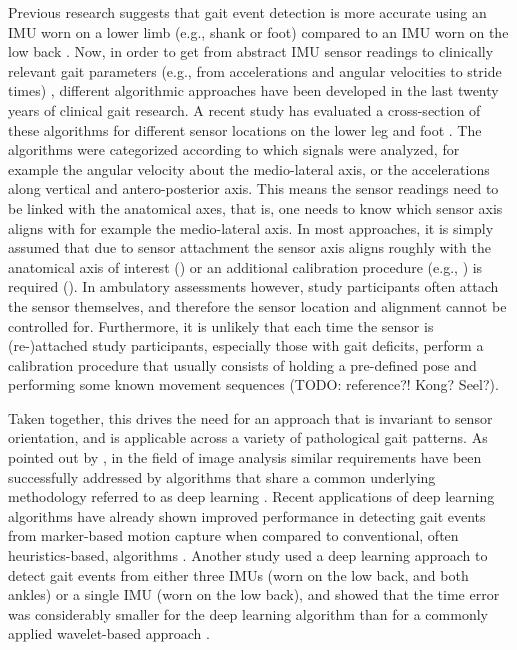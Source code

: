 \documentclass[sensors,article,submit,pdftex,moreauthors]{Definitions/mdpi}
\begin{document}
Previous research suggests that gait event detection is more accurate using an IMU worn on a lower limb (e.g., shank or foot) compared to an IMU worn on the low back \cite{BenMansour2015,Storm2016,Panebianco2018}. Now, in order to get from abstract IMU sensor readings to clinically relevant gait parameters (e.g., from accelerations and angular velocities to stride times) \cite{Hannink2016}, different algorithmic approaches have been developed in the last twenty years of clinical gait research. A recent study has evaluated a cross-section of these algorithms for different sensor locations on the lower leg and foot \cite{Niswander2021}. The algorithms were categorized according to which signals were analyzed, for example the angular velocity about the medio-lateral axis, or the accelerations along vertical and antero-posterior axis. This means the sensor readings need to be linked with the anatomical axes, that is, one needs to know which sensor axis aligns with for example the medio-lateral axis. In most approaches, it is simply assumed that due to sensor attachment the sensor axis aligns roughly with the anatomical axis of interest (\cite{Salarian2004,Sabatini2005,Jasiewicz2006,Catalfamo2010,Trojaniello2014,Maqbool2016,Romijnders2021}) or an additional calibration procedure (e.g., \cite{Ferraris1995}) is required (\cite{Greene2010,Niswander2021}). In ambulatory assessments however, study participants often attach the sensor themselves, and therefore the sensor location and alignment cannot be controlled for. Furthermore, it is unlikely that each time the sensor is (re-)attached study participants, especially those with gait deficits, perform a calibration procedure that usually consists of holding a pre-defined pose and performing some known movement sequences (TODO: reference?! Kong? Seel?). 

Taken together, this drives the need for an approach that is invariant to sensor orientation, and is applicable across a variety of pathological gait patterns. As pointed out by \cite{Hannink2016}, in the field of image analysis similar requirements have been successfully addressed by algorithms that share a common underlying methodology referred to as deep learning \cite{LeCun2015,TerHaarRomeny2019}. Recent applications of deep learning algorithms have already shown improved performance in detecting gait events from marker-based motion capture when compared to conventional, often heuristics-based, algorithms \cite{Kidzinski2019,Lempereur2020,Filtjens2020}. Another study used a deep learning approach to detect gait events from either three IMUs (worn on the low back, and both ankles) or a single IMU (worn on the low back), and showed that the time error was considerably smaller for the deep learning algorithm than for a commonly applied wavelet-based approach \cite{Gadaleta2019}.
\end{document}
